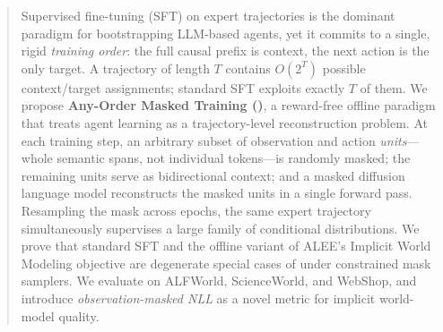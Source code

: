 \begin{abstract}
Supervised fine-tuning (SFT) on expert trajectories is the dominant paradigm for
bootstrapping LLM-based agents, yet it commits to a single, rigid \emph{training
order}: the full causal prefix is context, the next action is the only target.
A trajectory of length $T$ contains $O(2^T)$ possible context/target assignments;
standard SFT exploits exactly $T$ of them.
We propose \textbf{Any-Order Masked Training (\aomt{})}, a reward-free offline
paradigm that treats agent learning as a trajectory-level reconstruction problem.
At each training step, an arbitrary subset of observation and action
\emph{units}---whole semantic spans, not individual tokens---is randomly masked;
the remaining units serve as bidirectional context; and a masked diffusion language
model reconstructs the masked units in a single forward pass.
Resampling the mask across epochs, the same expert trajectory simultaneously
supervises a large family of conditional distributions.
We prove that standard SFT and the offline variant of ALEE's Implicit World
Modeling objective \citep{zhang2025alee} are degenerate special cases of \aomt{}
under constrained mask samplers.
We evaluate on ALFWorld, ScienceWorld, and WebShop, and introduce
\emph{observation-masked NLL} as a novel metric for implicit world-model quality.
\end{abstract}
